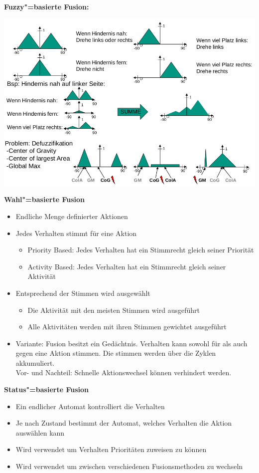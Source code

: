 \textbf{Fuzzy"=basierte Fusion:}\\
\begin{center}
\includegraphics[width=.8\textwidth]{figures/fuzzy_based.png}
\end{center}
\textbf{Wahl"=basierte Fusion}
\begin{itemize}
	\item Endliche Menge definierter Aktionen
	\item Jedes Verhalten stimmt für eine Aktion
	\begin{itemize}
		\item Priority Based: Jedes Verhalten hat ein Stimmrecht gleich seiner Priorität
		\item Activity Based: Jedes Verhalten hat ein Stimmrecht gleich seiner Aktivität
	\end{itemize}
	\item Entsprechend der Stimmen wird ausgewählt
	\begin{itemize}
		\item Die Aktivität mit den meisten Stimmen wird ausgeführt
		\item Alle Aktivitäten werden mit ihren Stimmen gewichtet ausgeführt
	\end{itemize}
	\item Variante: Fusion besitzt ein Gedächtnis. Verhalten kann sowohl für als auch gegen eine Aktion stimmen. Die stimmen werden über die Zyklen akkumuliert.\\
	 Vor- und Nachteil: Schnelle Aktionswechsel können verhindert werden.
\end{itemize}
\noindent
\textbf{Status"=basierte Fusion}
\begin{itemize}
	\item Ein endlicher Automat kontrolliert die Verhalten
	\item Je nach Zustand bestimmt der Automat, welches Verhalten die Aktion auswählen kann
	\item Wird verwendet um Verhalten Prioritäten zuweisen zu können
	\item Wird verwendet um zwischen verschiedenen Fusionsmethoden zu wechseln
\end{itemize}

